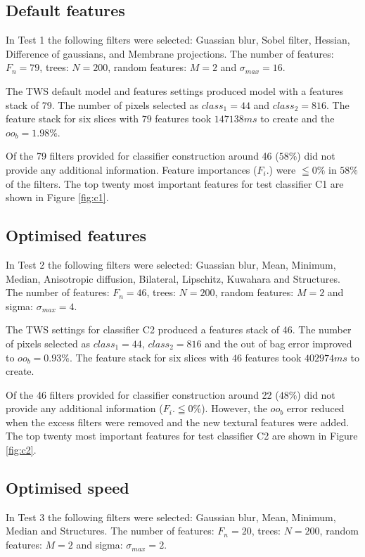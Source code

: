 \subsection{Default features}\label{sec:default-features}
In Test 1 the following filters were selected: Guassian blur, Sobel filter, Hessian, Difference of gaussians, and Membrane projections. The number of features: $F_n = 79$, trees: $N = 200$, random features: $M = 2$ and $\sigma_{max} = 16$.

The \ac{TWS} default model and features settings produced model with a features stack of 79. The number of pixels selected as $class_1 = 44 $ and $ class_2 = 816 $. The feature stack for six slices with $ 79 $ features took $ 147138ms $ to create and the $ oo_b = 1.98\% $.

Of the 79 filters provided for classifier construction around 46 ($58\%$) did not provide any additional information. Feature importances ($F_i.$) were $\leqq0\%$ in $58\%$ of the filters. The top twenty most important features for test classifier C1 are shown in Figure \ref{fig:c1}. 

\subsection{Optimised features}\label{sec:optimised-features}
In Test 2 the following filters were selected: Guassian blur, Mean, Minimum, Median, Anisotropic diffusion, Bilateral, Lipschitz, Kuwahara and Structures. The number of features: $F_n = 46$, trees: $N = 200$, random features: $M = 2$ and sigma: $\sigma_{max} = 4$. 

The \ac{TWS} settings for classifier C2 produced a features stack of 46. The number of pixels selected as $class_1 = 44 $, $ class_2 = 816 $ and the out of bag error improved to $ oo_b = 0.93\% $. The feature stack for six slices with $ 46 $ features took $402974ms$ to create. 

Of the 46 filters provided for classifier construction around 22 ($ 48\% $) did not provide any additional information ($F_i.\leqq0\%$). However, the $ oo_b $ error reduced when the excess filters were removed and the new textural features were added. The top twenty most important features for test classifier C2 are shown in Figure \ref{fig:c2}. 

\subsection{Optimised speed}\label{sec:optimised-speed}
In Test 3 the following filters were selected: Gaussian blur, Mean, Minimum, Median and Structures. The number of features: $F_n = 20$, trees: $N = 200$, random features: $M = 2$ and sigma: $\sigma_{max} = 2$. 

